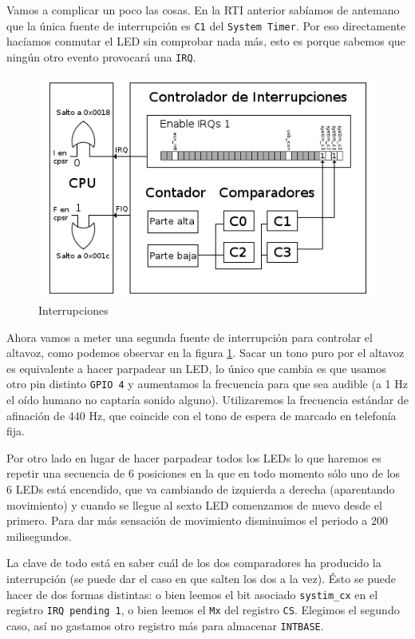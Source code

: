 Vamos a complicar un poco las cosas. En la RTI anterior sabíamos de antemano que la única fuente
de interrupción es {\tt C1} del {\tt System Timer}. Por eso directamente hacíamos conmutar el
LED sin comprobar nada más, esto es porque sabemos que ningún otro evento provocará una {\tt IRQ}.

\begin{figure}[h]
  \centering
    \includegraphics[width=14cm]{graphs/inter3.png}
  \caption{Interrupciones}
  \label{fig:inter3}
\end{figure}

Ahora vamos a meter una segunda fuente de interrupción para controlar el altavoz, como podemos
observar en la figura \ref{fig:inter3}. Sacar un tono
puro por el altavoz es equivalente a hacer parpadear un LED, lo único que cambia es que usamos
otro pin distinto {\tt GPIO 4} y aumentamos la frecuencia para que sea audible (a 1 Hz el oído
humano no captaría sonido alguno). Utilizaremos la frecuencia estándar de afinación
de 440 Hz, que coincide con el tono de espera de marcado en telefonía fija.

Por otro lado en lugar de hacer parpadear todos los LEDs lo que haremos es repetir una
secuencia de 6 posiciones en la que en todo momento sólo uno de los 6 LEDs está encendido, que
va cambiando de izquierda a derecha (aparentando movimiento) y cuando se llegue al sexto LED
comenzamos de nuevo desde el primero. Para dar más sensación de movimiento disminuimos el periodo
a 200 milisegundos.

La clave de todo está en saber cuál de los dos comparadores ha producido la interrupción (se
puede dar el caso en que salten los dos a la vez). Ésto se puede hacer de dos formas distintas:
o bien leemos el bit asociado {\tt systim\_cx} en el registro {\tt IRQ pending 1}, o bien leemos
el {\tt Mx} del registro {\tt CS}. Elegimos el segundo caso, así no gastamos otro registro más
para almacenar {\tt INTBASE}.

